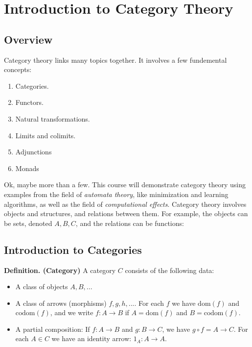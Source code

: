 \section{Introduction to Category Theory}
\subsection{Overview}
Category theory links many topics together. It involves a few fundemental concepts:
\begin{enumerate}
\item Categories.
\item Functors.
\item Natural transformations.
\item Limits and colimits.
\item Adjunctions
\item Monads
\end{enumerate}
Ok, maybe more than a few. This course will demonstrate category theory using examples from
the field of \emph{automata theory}, like minimization and learning algorithms, as well
as the field of \emph{computational effects}. Category theory involves objects and structures,
and relations between them. 
For example, the objects can be sets, denoted $A, B, C$, and the relations can be functions:
\begin{figure}
\end{figure}

\subsection{Introduction to Categories}
\textbf{Definition. (Category)} A category $C$ consists of the following data:
\begin{itemize}
\item A class of objects $A, B, ...$
\item A class of arrows (morphisms) $f, g, h, ...$. 
For each $f$ we have $\mathrm{dom}(f)$ and $\mathrm{codom}(f)$, and we write
$f: A \to B$ if $A = \mathrm{dom}(f)$ and $B = \mathrm{codom}(f)$.
\item A partial composition: If $f: A \to B$ and $g: B \to C$, we have 
$g \circ f = A \to C$.
For each $A \in C$ we have an identity arrow: $1_A : A \to A$.
\end{itemize}

